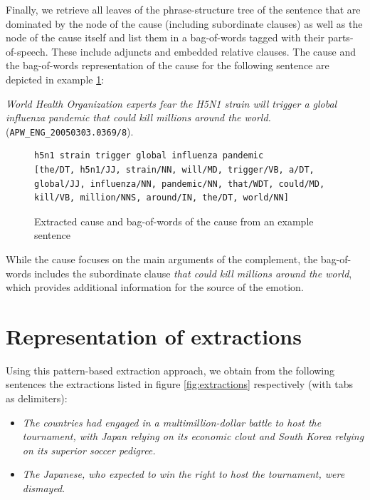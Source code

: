 Finally, we retrieve all leaves of the phrase-structure tree of the sentence that are dominated by the node of the cause (including subordinate clauses) as well as the node of the cause itself and list them in a bag-of-words tagged with their parts-of-speech. These include adjuncts and embedded relative clauses. The cause and the bag-of-words representation of the cause for the following sentence are depicted in example \ref{fig:cause-bag-of-words}:

\textit{World Health Organization experts fear the H5N1 strain will trigger a global influenza pandemic that could kill millions around the world.} (\texttt{APW\_ENG\_20050303.0369/8}).

\begin{figure}
\begin{lstlisting}
h5n1 strain	trigger global influenza pandemic
[the/DT, h5n1/JJ, strain/NN, will/MD, trigger/VB, a/DT, global/JJ, influenza/NN, pandemic/NN, that/WDT, could/MD, kill/VB, million/NNS, around/IN, the/DT, world/NN]
\end{lstlisting}
\caption{Extracted cause and bag-of-words of the cause from an example sentence}\label{fig:cause-bag-of-words}
\end{figure}

While the cause focuses on the main arguments of the complement, the bag-of-words includes the subordinate clause \textit{that could kill millions around the world}, which provides additional information for the source of the emotion.

\section{Representation of extractions} \label{sec:representation}

Using this pattern-based extraction approach, we obtain from the following sentences the extractions listed in figure \ref{fig:extractions} respectively (with tabs as delimiters):

\begin{itemize}[noitemsep,nolistsep]
	\item \textit{The countries had engaged in a multimillion-dollar battle to host the tournament, with Japan relying on its economic clout and South Korea relying on its superior soccer pedigree.}
	\item \textit{The Japanese, who expected to win the right to host the tournament, were dismayed}.
\end{itemize}

